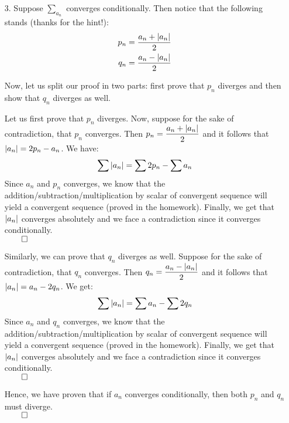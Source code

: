 \documentclass[11pt]{article}
\DeclarePairedDelimiter\abs{\lvert}{\rvert}%
\begin{document}
\begin{itemize}
        \newpage
        \item[3.]
            Suppose $\sum_{a_n}$ converges conditionally. Then notice that the
            following stands (thanks for the hint!):
            \begin{align*}
                p_n &= \dfrac{a_n + \abs{a_n}}{2}\\
                q_n &= \dfrac{a_n - \abs{a_n}}{2}
            \end{align*}

            Now, let us split our proof in two parts: first prove that $p_n$
            diverges and then show that $q_n$ diverges as well.

            Let us first prove that $p_n$ diverges. Now, suppose for the sake
            of contradiction, that $p_n$ converges. Then $p_n = \dfrac{a_n +
            \abs{a_n}}{2}$ and it follows that $\abs{a_n} = 2p_n - a_n$. We
            have:
            \begin{align*}
                \sum{\abs{a_n}} = \sum{2p_n} - \sum{a_n}
            \end{align*}
            Since $a_n$ and $p_n$ converges, we know that the
            addition/subtraction/multiplication by scalar of convergent
            sequence will yield a convergent sequence (proved in the homework).
            Finally, we get that $\abs{a_n}$ converges absolutely and we face a
            contradiction since it converges conditionally.\\
            $\qed$

            Similarly, we can prove that $q_n$ diverges as well. Suppose for
            the sake of contradiction, that $q_n$ converges. Then $q_n =
            \dfrac{a_n - \abs{a_n}}{2}$ and it follows that $\abs{a_n} = a_n -
            2q_n$. We get:
            \begin{align*}
                \sum{\abs{a_n}} = \sum{a_n} - \sum{2q_n}
            \end{align*}
            Since $a_n$ and $q_n$ converges, we know that the
            addition/subtraction/multiplication by scalar of convergent
            sequence will yield a convergent sequence (proved in the homework).
            Finally, we get that $\abs{a_n}$ converges absolutely and we face a
            contradiction since it converges conditionally.\\
            $\qed$

            Hence, we have proven that if $a_n$ converges conditionally, then
            both $p_n$ and $q_n$ must diverge.\\
            $\qed$


\end{itemize}
\end{document}
